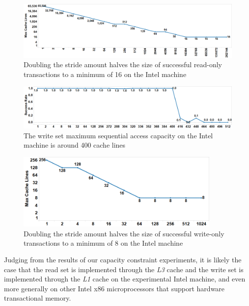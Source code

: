 \begin{figure}[]%
\centering
{}
\includegraphics[width=\linewidth]{images/wttm_stride_read_intel}
\caption{Doubling the stride amount halves the size of successful read-only
transactions to a minimum of 16 on the Intel machine}
\label{fig:wttm_stride_read_intel}
\end{figure}

\begin{figure}[]%
\centering
{}
\includegraphics[width=\linewidth]{images/wttm_capacity_write_intel}
\caption{The write set maximum sequential access capacity on the Intel machine is
around 400 cache lines}
\label{fig:wttm_capacity_write_intel}
\end{figure}

\begin{figure}[]%
\centering
{}
\includegraphics[width=100mm]{images/wttm_stride_write_intel}
\caption{Doubling the stride amount halves the size of successful write-only
transactions to a minimum of 8 on the Intel machine}
\label{fig:wttm_stride_write_intel}
\end{figure}

Judging from the results of our capacity constraint experiments, it is likely
the case that the read set is implemented through the \textit{L3} cache and the
write set is implemented through the \textit{L1} cache on the experimental Intel
machine, and even more generally on other Intel x86 microprocessors that support
hardware transactional memory.

